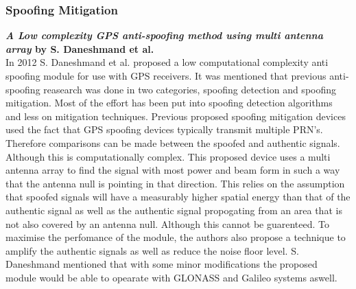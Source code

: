 \medskip

\subsubsection{Spoofing Mitigation}

\textbf{\emph{A Low complexity GPS anti-spoofing method using multi antenna array} by S. Daneshmand et al.} \\
In 2012 S. Daneshmand et al. \cite{RN8} proposed a low computational complexity anti spoofing module for use with GPS receivers.
It was mentioned that previous anti-spoofing reasearch was done in two categories, spoofing detection and spoofing mitigation.
Most of the effort has been put into spoofing detection algorithms and less on mitigation techniques. 
Previous proposed spoofing mitigation devices used the fact that GPS spoofing devices typically transmit multiple PRN's. 
Therefore comparisons can be made between the spoofed and authentic signals. Although this is computationally complex. This proposed
device uses a multi antenna array to find the signal with most power and beam form in such a way that the antenna null is pointing in
that direction. This relies on the assumption that spoofed signals will have a measurably higher spatial energy than that of the authentic signal
as well as the authentic signal propogating from an area that is not also covered by an antenna null. Although this cannot be guarenteed.
To maximise the perfomance of the module, the authors also propose a technique to amplify the authentic signals as well as reduce the noise floor level.
S. Daneshmand mentioned that with some minor modifications the proposed module would be able to opearate with GLONASS and Galileo systems aswell. 

\medskip

